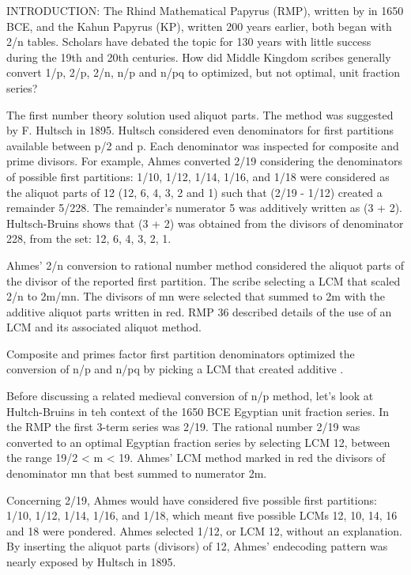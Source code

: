 \documentclass[12pt]{article}
\begin{document}
INTRODUCTION: The Rhind Mathematical Papyrus (RMP), written by  in 1650 BCE, and the Kahun Papyrus (KP), written 200 years earlier, both began with 2/n tables. Scholars have debated the topic for 130 years with little success during the 19th and 20th centuries. How did Middle Kingdom scribes generally convert 1/p, 2/p, 2/n, n/p and n/pq to optimized, but not optimal, unit fraction series? 

The first number theory solution used aliquot parts. The method was suggested by F. Hultsch in 1895. Hultsch considered even denominators for first partitions available between p/2 and p. Each denominator was inspected for composite and prime divisors. For example, Ahmes converted 2/19 considering the denominators of possible first partitions: 1/10, 1/12, 1/14, 1/16, and 1/18 were considered as the aliquot parts of 12 (12, 6, 4, 3, 2 and 1) such that (2/19 - 1/12) created a remainder 5/228. The remainder's numerator 5 was additively written as (3 + 2).  Hultsch-Bruins shows that (3 + 2) was obtained from the divisors  of denominator 228, from the set: {12, 6, 4, 3, 2, 1}.

Ahmes' 2/n conversion to rational number method considered the aliquot parts of the divisor of the reported first partition. The scribe selecting a LCM that scaled 2/n to 2m/mn. The divisors of mn were selected that summed to 2m with the additive aliquot parts written in red. RMP 36 described details of the use of an LCM and its associated aliquot method. 

Composite and primes factor first partition denominators optimized the conversion of n/p and n/pq by picking a LCM that created additive .  

Before discussing a related medieval conversion of n/p method, let's look at Hultch-Bruins in teh context of the 1650 BCE Egyptian unit fraction series. In the RMP the first 3-term series was 2/19. The rational number 2/19 was converted to an optimal Egyptian fraction series by selecting LCM 12, between the range 19/2 < m < 19. Ahmes' LCM method marked in red the divisors of denominator mn that best summed to numerator 2m. 

Concerning 2/19, Ahmes would have considered five possible first partitions: 1/10, 1/12, 1/14, 1/16, and 1/18, which meant five possible LCMs 12, 10, 14, 16 and 18 were pondered. Ahmes selected 1/12, or LCM 12, without an explanation. By inserting the aliquot parts (divisors) of 12, Ahmes' endecoding pattern was nearly exposed by Hultsch in 1895. 
\end{document}

